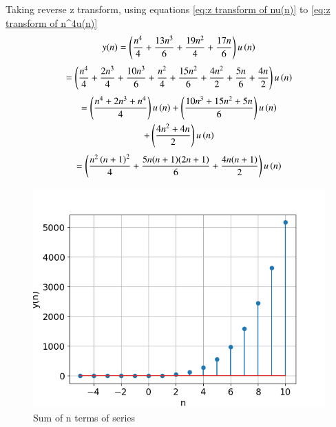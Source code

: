 \documentclass[journal,12pt,twocolumn]{IEEEtran}
\theoremstyle{remark}
\begin{document}
    Taking reverse z transform, using equations \eqref{eq:z transform of nu(n)} to \eqref{eq:z transform of n^4u(n)}
    \begin{align}
        y(n) = \left(\frac{n^4}{4} + \frac{13n^3}{6} + \frac{19n^2}{4} + \frac{17n}{6}\right) u\left(n\right)
    \end{align}
    \begin{multline}
        = \left(\frac{n^4}{4} + \frac{2n^3}{4} + \frac{10n^3}{6} + \frac{n^2}{4} + \frac{15n^2}{6} + \frac{4n^2}{2} + \frac{5n}{6} + \frac{4n}{2}\right) u\left(n\right)
    \end{multline}
    \begin{multline}
        = \left(\frac{n^4+2n^3+n^4}{4}\right)u\left(n\right) +\left(\frac{10n^3+15n^2+5n}{6}\right)u\left(n\right)\\
        +\left(\frac{4n^2+4n}{2}\right)u\left(n\right)
    \end{multline}
    \begin{multline}
        = \left(\frac{n^2\left(n+1\right)^2}{4} + \frac{5n(n+1)(2n+1)}{6} 
        + \frac{4n(n+1)}{2}\right) u\left(n\right)
    \end{multline}
    \begin{figure}[!h] 
    \centering
    \includegraphics[width=\columnwidth]{figs/sumplot.png}
    \caption{Sum of n terms of series}
    \label{fig:Graph1_math.11.9.4.8}
    \end{figure}
\end{document}
